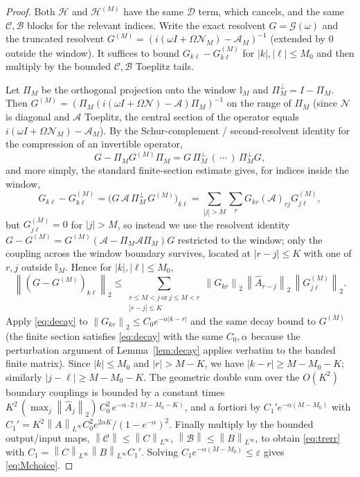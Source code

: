 \documentclass{amsart}
\theoremstyle{definition}
\newcommand{\norm}[1]{\left\lVert#1\right\rVert}
\newcommand{\Acal}{\mathcal{A}}
\newcommand{\Bcal}{\mathcal{B}}
\newcommand{\Ccal}{\mathcal{C}}
\newcommand{\Dcal}{\mathcal{D}}
\newcommand{\Hcal}{\mathcal{H}}
\newcommand{\Ncal}{\mathcal{N}}
\begin{document}
\begin{proof}
Both $\Hcal$ and $\Hcal^{(M)}$ have the same $\Dcal$ term, which cancels, and
the same $\Ccal,\Bcal$ blocks for the relevant indices. Write the exact resolvent
$G=\mathcal G(\omega)$ and the truncated resolvent
$G^{(M)}=(i(\omega I+\Omega\Ncal_M)-\Acal_M)^{-1}$ (extended by $0$ outside the
window). It suffices to bound $G_{k\ell}-G^{(M)}_{k\ell}$ for $|k|,|\ell|\le M_0$
and then multiply by the bounded $\Ccal,\Bcal$ Toeplitz tails.

Let $\Pi_M$ be the orthogonal projection onto the window $\mathbb I_M$ and
$\Pi_M^\perp=I-\Pi_M$. Then $G^{(M)}=(\Pi_M(i(\omega I+\Omega\Ncal)-\Acal)\Pi_M)^{-1}$
on the range of $\Pi_M$ (since $\Ncal$ is diagonal and $\Acal$ Toeplitz, the
central section of the operator equals $i(\omega I+\Omega\Ncal_M)-\Acal_M$). By
the Schur-complement / second-resolvent identity for the compression of an
invertible operator,
\[
G-\Pi_M G^{(M)}\Pi_M=G\,\Pi_M^\perp\,(\,\cdots\,)\,\Pi_M^\perp G ,
\]
and more simply, the standard finite-section estimate gives, for indices inside
the window,
\[
G_{k\ell}-G^{(M)}_{k\ell}
= \big(G\,\Acal\,\Pi_M^\perp\,G^{(M)}\big)_{k\ell}
=\sum_{|j|>M}\sum_{r}G_{kr}(\Acal)_{rj}G^{(M)}_{j\ell},
\]
but $G^{(M)}_{j\ell}=0$ for $|j|>M$, so instead we use the resolvent identity
$G-G^{(M)}=G^{(M)}(\Acal-\Pi_M\Acal\Pi_M)G$ restricted to the window; only the
coupling across the window boundary survives, located at
$|r-j|\le K$ with one of $r,j$ outside $\mathbb I_M$. Hence for
$|k|,|\ell|\le M_0$,
\[
\norm{(G-G^{(M)})_{k\ell}}_2
\le \sum_{\substack{r\le M<j\ \text{or}\ j\le M<r\\ |r-j|\le K}}
\norm{G_{kr}}_2\,\norm{\hat A_{r-j}}_2\,\norm{G^{(M)}_{j\ell}}_2 .
\]
Apply \eqref{eq:decay} to $\norm{G_{kr}}_2\le C_0 e^{-\alpha|k-r|}$ and the same
decay bound to $G^{(M)}$ (the finite section satisfies \eqref{eq:decay} with the
same $C_0,\alpha$ because the perturbation argument of Lemma~\ref{lem:decay}
applies verbatim to the banded finite matrix). Since $|k|\le M_0$ and
$|r|>M-K$, we have $|k-r|\ge M-M_0-K$; similarly $|j-\ell|\ge M-M_0-K$. The
geometric double sum over the $O(K^2)$ boundary couplings is bounded by a
constant times $K^2\,(\max_j\norm{\hat A_j}_2)\,C_0^2\,e^{-\alpha\cdot 2(M-M_0-K)}$,
and a fortiori by $C_1' e^{-\alpha(M-M_0)}$ with
$C_1'=K^2\norm{A}_{L^\infty}C_0^2 e^{2\alpha K}/(1-e^{-\alpha})^2$. Finally
multiply by the bounded output/input maps,
$\norm{\Ccal}\le\norm{C}_{L^\infty}$, $\norm{\Bcal}\le\norm{B}_{L^\infty}$,
to obtain \eqref{eq:trerr} with
$C_1=\norm{C}_{L^\infty}\norm{B}_{L^\infty}C_1'$. Solving
$C_1 e^{-\alpha(M-M_0)}\le\varepsilon$ gives \eqref{eq:Mchoice}.
\end{proof}
\end{document}
